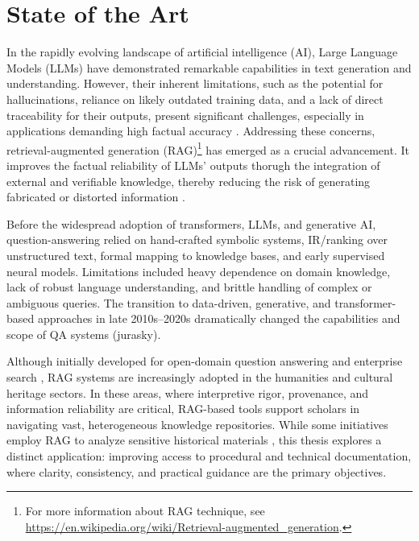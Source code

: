 \chapter{State of the Art}
\label{chap:sota}
\begin{spacing}{1.5}
\sloppy
In the rapidly evolving landscape of artificial intelligence (AI), Large Language Models (LLMs) have demonstrated remarkable capabilities in text generation and understanding. However, their inherent limitations, such as the potential for hallucinations, reliance on likely outdated training data, and a lack of direct traceability for their outputs, present significant challenges, especially in applications demanding high factual accuracy \citep{vaibhav_retrieval-augmented_2025}. Addressing these concerns, retrieval-augmented generation (RAG)\footnote{For more information about RAG technique, see \url{https://en.wikipedia.org/wiki/Retrieval-augmented_generation}.} has emerged as a crucial advancement. It improves the factual reliability of LLMs' outputs thorugh the integration of external and verifiable knowledge, thereby reducing the risk of generating fabricated or distorted information \citep{martineau_what_2023}.

Before the widespread adoption of transformers, LLMs, and generative AI, question-answering relied on hand-crafted symbolic systems, IR/ranking over unstructured text, formal mapping to knowledge bases, and early supervised neural models. Limitations included heavy dependence on domain knowledge, lack of robust language understanding, and brittle handling of complex or ambiguous queries. The transition to data-driven, generative, and transformer-based approaches in late 2010s–2020s dramatically changed the capabilities and scope of QA systems (jurasky).

Although initially developed for open-domain question answering and enterprise search \parencite{akkiraju_facts_2024, jiang_towards_2024, packowski_optimizing_2024, yang_ragva_2025, zhou_enabling_2025}, RAG systems are increasingly adopted in the humanities and cultural heritage sectors. In these areas, where interpretive rigor, provenance, and information reliability are critical, RAG-based tools support scholars in navigating vast, heterogeneous knowledge repositories. While some initiatives employ RAG to analyze sensitive historical materials \citep{callaghan_prototyping_2025, ciletti_retrieval-augmented_2025, sergeev_talking_2025, fan_research_2025}, this thesis explores a distinct application: improving access to procedural and technical documentation, where clarity, consistency, and practical guidance are the primary objectives.
\\


\end{spacing}
